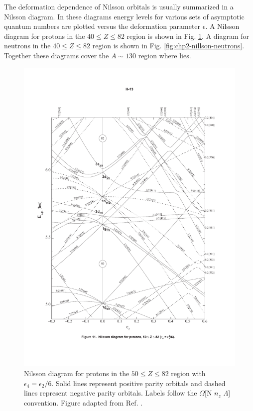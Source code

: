 The deformation dependence of Nilsson orbitals is usually summarized in a Nilsson diagram. In these diagrams energy levels for various sets of asymptotic quantum numbers are plotted versus the deformation parameter $\epsilon$. A Nilsson diagram for protons in the $40\leq{}Z\leq82$ region is shown in Fig. \ref{fig:chp2-nillson-protons}. A diagram for neutrons in the $40\leq{}Z\leq82$ region is shown in Fig. \ref{fig:chp2-nillson-neutrons}. Together these diagrams cover the $A\sim 130$ region where \pr{} lies.

\begin{figure}[h!]
\centerline{\includegraphics[height=0.8\textheight,clip=true,trim=10 100 10 100]{./img/c2/nilsson_proton_diagram.pdf}}
	\caption{Nilsson diagram for protons in the $50\leq Z \leq 82$ region with $\epsilon_4=\epsilon_2/6$. Solid lines represent positive parity orbitals and dashed lines represent negative parity orbitals. Labels follow the $\Omega$[N $n_z$ $\Lambda$] convention. Figure adapted from Ref. \cite{nilssonDiagrams}.\label{fig:chp2-nillson-protons}}
\end{figure}


